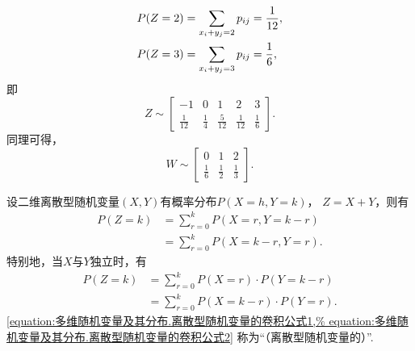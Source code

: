 \begin{example}
\begin{solution}
\begin{align*}
	&P(Z=2) = \sp{2} = \frac{1}{12}, \\
	&P(Z=3) = \sp{3} = \frac{1}{6},
\end{align*}
即\[
	Z \sim \begin{bmatrix}
		-1 & 0 & 1 & 2 & 3 \\
		\frac{1}{12} & \frac{1}{4} & \frac{5}{12} & \frac{1}{12} & \frac{1}{6}
	\end{bmatrix}.
\]
同理可得，\[
	W \sim \begin{bmatrix}
		0 & 1 & 2 \\
		\frac{1}{6} & \frac{1}{2} & \frac{1}{3}
	\end{bmatrix}.
\]
\end{solution}
\end{example}

\begin{theorem}\label{theorem:多维随机变量及其分布.离散型随机变量的卷积公式}
设二维离散型随机变量\((X,Y)\)有概率分布\(P(X=h,Y=k)\)，
\(Z=X+Y\)，则有\begin{align}
	P(Z=k)
	&= \sum_{r=0}^k P(X=r,Y=k-r) \\
	&= \sum_{r=0}^k P(X=k-r,Y=r).
\end{align}
特别地，当\(X\)与\(Y\)独立时，有\begin{align}
	P(Z=k)
	&= \sum_{r=0}^k P(X=r) \cdot P(Y=k-r) \label{equation:多维随机变量及其分布.离散型随机变量的卷积公式1} \\
	&= \sum_{r=0}^k P(X=k-r) \cdot P(Y=r). \label{equation:多维随机变量及其分布.离散型随机变量的卷积公式2}
\end{align}
\rm\cref{equation:多维随机变量及其分布.离散型随机变量的卷积公式1,%
equation:多维随机变量及其分布.离散型随机变量的卷积公式2}
称为“（离散型随机变量的）”.
\end{theorem}

